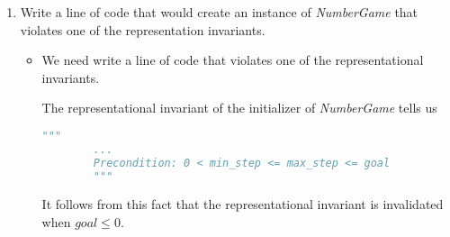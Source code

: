 \documentclass[12pt]{article}
\begin{document}
\begin{enumerate}[1.]
\begin{itemize}






    \end{itemize}

    \item Write a line of code that would create an instance of \textit{NumberGame}
    that violates one of the representation invariants.

    \begin{itemize}
        \item

        We need write a line of code that violates one of the representational
        invariants.

        \bigskip

        The representational invariant of the initializer of
        \textit{NumberGame} tells us

        \bigskip

        \begin{lstlisting}[language=Python]
        """
        ...
        Precondition: 0 < min_step <= max_step <= goal
        """
        \end{lstlisting}

        \bigskip

        It follows from this fact that the representational invariant is
        invalidated when $goal \leq 0$.


\end{itemize}
\end{enumerate}
\end{document}
